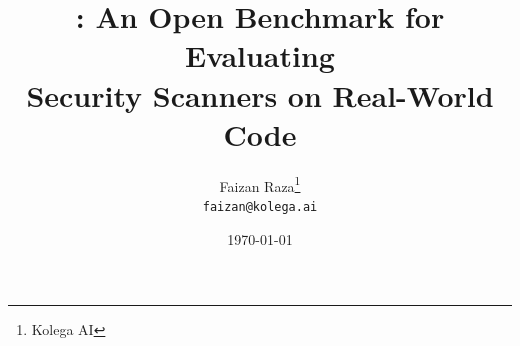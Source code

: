 \documentclass[11pt,a4paper]{article}
\title{\realvuln{}: An Open Benchmark for Evaluating\\Security Scanners on Real-World Code}
\author{
  Faizan Raza\thanks{Kolega AI} \\
  \texttt{faizan@kolega.ai}
}
\date{\today}
\begin{document}
\maketitle

\begin{abstract}

\end{abstract}














\appendix

\end{document}
